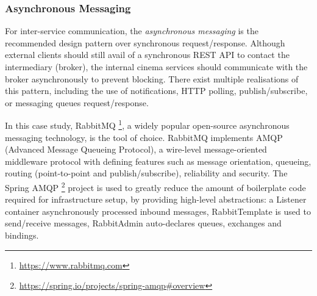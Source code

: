 \subsubsection{Asynchronous Messaging}

For inter-service communication, the \textit{asynchronous messaging} is the recommended design pattern over synchronous request/response. Although external clients should still avail of a synchronous REST API to contact the intermediary (broker), the internal cinema services should communicate with the broker asynchronously to prevent blocking. There exist multiple realisations of this pattern, including the use of notifications, HTTP polling, publish/subscribe, or messaging queues request/response.

In this case study, RabbitMQ \footnote{\url{https://www.rabbitmq.com}}, a widely popular open-source asynchronous messaging technology, is the tool of choice. RabbitMQ implements AMQP (Advanced Message Queueing Protocol), a wire-level message-oriented middleware protocol with defining features such as message orientation, queueing, routing (point-to-point and publish/subscribe), reliability and security. The Spring AMQP \footnote{\url{https://spring.io/projects/spring-amqp\#overview}} project is used to greatly reduce the amount of boilerplate code required for infrastructure setup, by providing high-level abstractions: a Listener container asynchronously processed inbound messages, RabbitTemplate is used to send/receive messages, RabbitAdmin auto-declares queues, exchanges and bindings.

